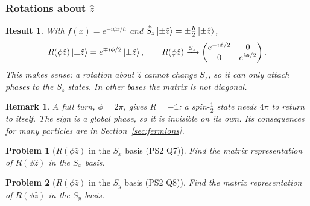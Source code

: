 \documentclass{article}
\newtheorem{problem}{Problem}
\newtheorem{remark}{Remark}
\newtheorem{result}{Result}
\newcommand{\id}{\mathds{1}}
\begin{document}
\subsubsection{Rotations about \texorpdfstring{$\hat{z}$}{z}}
\begin{result}
    With $f(x) = e^{-i\phi x/\hbar}$ and $\hat{S}_z\ket{\pm\hat{z}} = \pm\frac{\hbar}{2}\ket{\pm\hat{z}}$,
    \begin{equation}
        R(\phi\hat{z})\ket{\pm\hat{z}} = e^{\mp i\phi/2}\ket{\pm\hat{z}}, \qquad R(\phi\hat{z}) \xrightarrow{S_z} \begin{pmatrix} e^{-i\phi/2} & 0 \\ 0 & e^{i\phi/2} \end{pmatrix}.
    \end{equation}
    This makes sense: a rotation about $\hat{z}$ cannot change $S_z$, so it can only attach phases to the $S_z$ states. In other bases the matrix is not diagonal.
\end{result}
\begin{remark}
    \label{rem:2pi}
    A full turn, $\phi = 2\pi$, gives $R = -\id$: a spin-$\tfrac12$ state needs $4\pi$ to return to itself. The sign is a global phase, so it is invisible on its own. Its consequences for many particles are in Section~\ref{sec:fermions}.
\end{remark}
\begin{problem}[$R(\phi\hat{z})$ in the $S_x$ basis (PS2 Q7)]
    Find the matrix representation of $R(\phi\hat{z})$ in the $S_x$ basis.
\end{problem}
\begin{problem}[$R(\phi\hat{z})$ in the $S_y$ basis (PS2 Q8)]
    \label{prob:Rz-y}
    Find the matrix representation of $R(\phi\hat{z})$ in the $S_y$ basis.
\end{problem}
\end{document}

